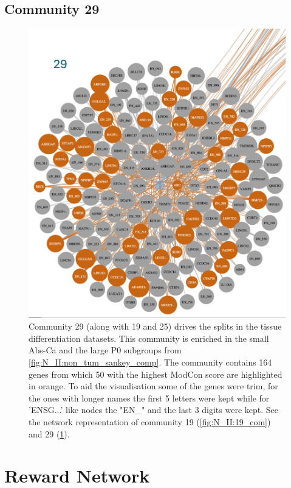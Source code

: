 \subsection*{Community 29}

\begin{figure}[H]    
    \centering
    \includegraphics[width=1.0\textwidth,height=1.0\textheight,keepaspectratio]{Sections/Network_II/resources/non_tum/29_com.png}
    \caption{Community 29 (along with 19 and 25) drives the splits in the tissue differentiation datasets. This community is enriched in the small Abs-Ca and the large P0 subgroups from \cref{fig:N_II:non_tum_sankey_comp}. The community contains 164 genes from which 50 with the highest ModCon score are highlighted in orange. To aid the visualisation some of the genes were trim, for the ones with longer names the first 5 letters were kept while for 'ENSG...' like nodes the "EN\_" and the last 3 digits were kept.  See the network representation of community 19 (\cref{fig:N_II:19_com}) and 29 (\cref{fig:ap:com_29}).}
    \label{fig:ap:com_29}
\end{figure}



\section{Reward Network}


